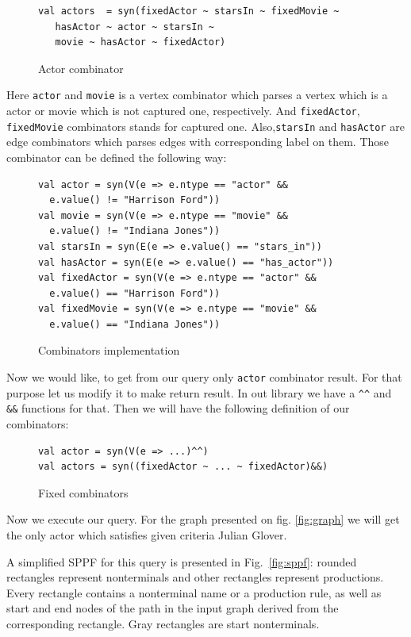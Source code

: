 \begin{figure}[h]
\begin{lstlisting}
val actors  = syn(fixedActor ~ starsIn ~ fixedMovie ~ 
   hasActor ~ actor ~ starsIn ~ 
   movie ~ hasActor ~ fixedActor)
\end{lstlisting}
\caption{Actor combinator}
\label{fig:exampleQuery}
\end{figure}

Here \lstinline{actor} and \lstinline{movie} is a vertex combinator which parses a vertex which is a actor or movie which is not captured one, respectively. And \lstinline{fixedActor}, \lstinline{fixedMovie} combinators stands for captured one. Also,\lstinline{starsIn} and \lstinline{hasActor} are edge combinators which parses edges with corresponding label on them. Those combinator can be defined the following way:

\begin{figure}[h]
\begin{lstlisting}
val actor = syn(V(e => e.ntype == "actor" &&
  e.value() != "Harrison Ford"))
val movie = syn(V(e => e.ntype == "movie" && 
  e.value() != "Indiana Jones"))
val starsIn = syn(E(e => e.value() == "stars_in"))
val hasActor = syn(E(e => e.value() == "has_actor"))
val fixedActor = syn(V(e => e.ntype == "actor" &&
  e.value() == "Harrison Ford"))
val fixedMovie = syn(V(e => e.ntype == "movie" &&
  e.value() == "Indiana Jones"))
\end{lstlisting}
\caption{Combinators implementation}
\label{fig:combImpl}
\end{figure}

Now we would like, to get from our query only \lstinline{actor} combinator result. For that purpose let us modify it to make return result. In out library we have a \lstinline{^^} and \lstinline{&&} functions for that. Then we will have the following definition of our combinators:
\begin{figure}[h]
\begin{lstlisting}
val actor = syn(V(e => ...)^^)
val actors = syn((fixedActor ~ ... ~ fixedActor)&&)
\end{lstlisting}
\caption{Fixed combinators}
\label{fig:fixedAtor}
\end{figure}

Now we execute our query. For the graph presented on fig. \ref{fig:graph} we will get the only actor which satisfies given criteria Julian Glover.

A simplified SPPF for this query is presented in Fig.~\ref{fig:sppf}: rounded rectangles represent nonterminals and other rectangles represent productions. 
Every rectangle contains a nonterminal name or a production rule, as well as start and end nodes of the path in the input graph derived from the corresponding rectangle. 
Gray rectangles are start nonterminals.

